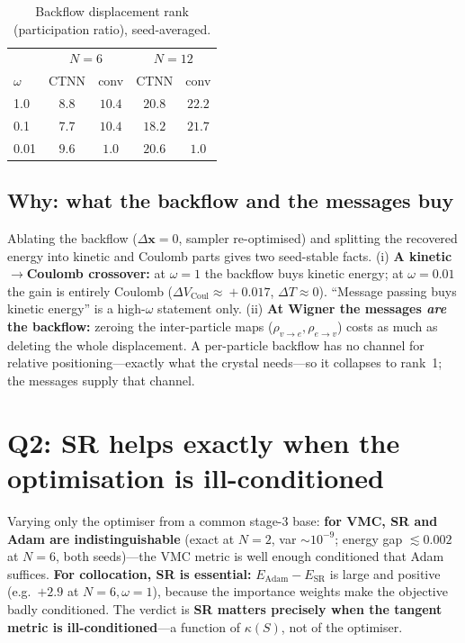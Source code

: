 \begin{table}[htbp]\centering
\caption{Backflow displacement rank (participation ratio), seed-averaged.}
\label{tab:bf_rank}
\begin{tabular}{l|cc|cc}
\hline
 & \multicolumn{2}{c|}{$N=6$} & \multicolumn{2}{c}{$N=12$}\\
$\omega$ & CTNN & conv & CTNN & conv \\
\hline
1.0  & $8.8$ & $10.4$ & $20.8$ & $22.2$ \\
0.1  & $7.7$ & $10.4$ & $18.2$ & $21.7$ \\
0.01 & $9.6$ & $\mathbf{1.0}$ & $20.6$ & $\mathbf{1.0}$ \\
\hline
\end{tabular}
\end{table}

\subsection{Why: what the backflow and the messages buy}
Ablating the backflow ($\Delta\mathbf{x}\!=\!0$, sampler re-optimised) and
splitting the recovered energy into kinetic and Coulomb parts gives two
seed-stable facts. (i) \textbf{A kinetic$\to$Coulomb crossover:} at $\omega=1$ the
backflow buys kinetic energy; at $\omega=0.01$ the gain is entirely Coulomb
($\Delta V_{\mathrm{Coul}}\!\approx\!+0.017$, $\Delta T\!\approx\!0$). ``Message
passing buys kinetic energy'' is a high-$\omega$ statement only. (ii) \textbf{At
Wigner the messages \emph{are} the backflow:} zeroing the inter-particle maps
($\rho_{v\to e},\rho_{e\to v}$) costs as much as deleting the whole displacement.
A per-particle backflow has no channel for relative positioning---exactly what the
crystal needs---so it collapses to rank~1; the messages supply that channel.

\section{Q2: SR helps exactly when the optimisation is ill-conditioned}
\label{sec:q2}

Varying only the optimiser from a common stage-3 base:
\textbf{for VMC, SR and Adam are indistinguishable} (exact at $N=2$, var
$\sim\!10^{-9}$; energy gap $\lesssim 0.002$ at $N=6$, both seeds)---the VMC metric
is well enough conditioned that Adam suffices. \textbf{For collocation, SR is
essential:} $E_{\mathrm{Adam}}-E_{\mathrm{SR}}$ is large and positive (e.g.\ $+2.9$
at $N=6,\omega=1$), because the importance weights make the objective badly
conditioned. The verdict is \textbf{SR matters precisely when the tangent metric is
ill-conditioned}---a function of $\kappa(S)$, not of the optimiser.

